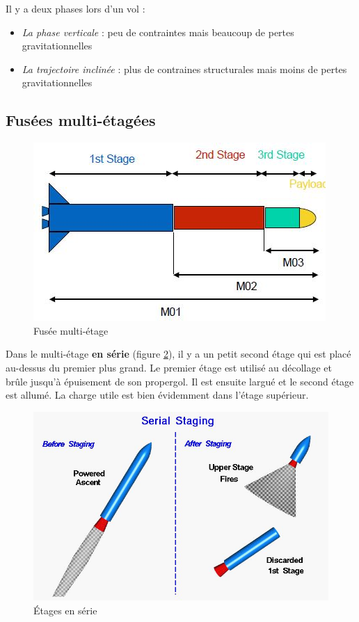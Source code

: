 \documentclass{report}
\begin{document}
Il y a deux phases lors d'un vol :
\begin{itemize}
    \item \textit{La phase verticale} : peu de contraintes mais beaucoup de pertes gravitationnelles
    \item \textit{La trajectoire inclinée} : plus de contraines structurales mais moins de pertes gravitationnelles
\end{itemize}

\subsection{Fusées multi-étagées}

\begin{figure}[h!]
    \centering
    \includegraphics[scale=0.7]{53}
    \caption{Fusée multi-étage}
    \label{53}
\end{figure}

Dans le multi-étage \textbf{en série} (figure \ref{54}), il y a un petit second étage qui est placé au-dessus du premier plus grand. Le premier étage est utilisé au décollage et brûle jusqu'à épuisement de son propergol. Il est ensuite largué et le second étage est allumé. La charge utile est bien évidemment dans l'étage supérieur.

\begin{figure}[h!]
    \centering
    \includegraphics[scale=0.7]{54}
    \caption{Étages en série}
    \label{54}
\end{figure}
\end{document}
